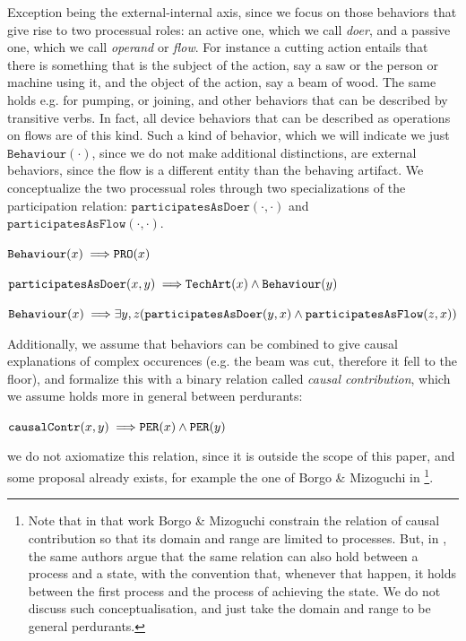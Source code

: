 \documentclass[sw]{iosart2x}
\newcommand{\bflist}{\begin{list}{}{\setlength{\topsep}{2mm}\setlength{\partopsep}{0mm}\setlength{\parsep}{0mm}\setlength{\leftmargin}{9mm}\setlength{\labelwidth}{8mm}}}
\newcommand{\eflist}{\end{list}}
\newcommand{\AxLabel}{\textrm{a}}
\newcounter{cntax}
\newcommand{\myax}[1]{\refstepcounter{cntax}\begin{small}{\bf \AxLabel\thecntax\label{ax:#1}}\end{small}}
\newcommand{\generalStyle}[1]{\texttt{#1}}
\newcommand{\biRel}[3]{\generalStyle{#1}(#2,#3)}
\newcommand{\uniRel}[2]{\generalStyle{#1}(#2)}
\newcommand{\myfi}{\hspace{0.9mm} \Longrightarrow}
\newcommand{\DOLCEProcess}[1]{\uniRel{PRO}{#1}}
\newcommand{\DOLCEPerdurant}[1]{\uniRel{{PER}}{#1}}
\newcommand{\TechArt}[1]{\uniRel{TechArt}{#1}}
\newcommand{\BehaviourConcrete}[1]{\uniRel{Behaviour}{#1}}
\newcommand{\causallyContr}[2]{\biRel{causalContr}{#1}{#2}}
\newcommand{\participateAsDoer}[2]{\biRel{participatesAsDoer}{#1}{#2}}
\newcommand{\participateAsFlow}[2]{\biRel{participatesAsFlow}{#1}{#2}}
\newcommand{\firstTimeKeyWord}[1]{\textit{#1}}
\begin{document}
Exception being the external-internal axis, since we focus on those behaviors that give rise to two processual roles: an active one, which we call \firstTimeKeyWord{doer}, and a passive one, which we call \firstTimeKeyWord{operand} or \firstTimeKeyWord{flow}. 
For instance a cutting action entails that there is something that is the subject of the action, say a saw or the person or machine using it, and the object of the action, say a beam of wood.
The same holds e.g. for pumping, or joining, and other behaviors that can be described by transitive verbs. 
In fact, all device behaviors that can be described as operations on flows are of this kind. 
Such a kind of behavior, which we will indicate we just $\BehaviourConcrete{\cdot}$, since we do not make additional distinctions, are external behaviors, since the flow is a different entity than the behaving artifact.
We conceptualize the two processual roles through two specializations of the participation relation: $\participateAsDoer{\cdot}{\cdot}$ and $\participateAsFlow{\cdot}{\cdot}$. 
\bflist
  \item[\myax{behaviorSubsum}] $ \BehaviourConcrete{x} \myfi \DOLCEProcess{x} $
  \item[\myax{participateAsDoerRage}]  $ \participateAsDoer{x}{y} \myfi \TechArt{x} \land \BehaviourConcrete{y} $
  \item[\myax{processualRoles}] $ \BehaviourConcrete{x} \myfi \exists y,z(\participateAsDoer{y}{x} \land \participateAsFlow{z}{x}) $ 
\eflist

Additionally, we assume that behaviors can be combined to give causal explanations of complex occurences (e.g. the beam was cut, therefore it fell to the floor), and formalize this with a binary relation called \firstTimeKeyWord{causal contribution}, which we assume holds more in general between perdurants:
\bflist
  \item[\myax{contribRange}] $ \causallyContr{x}{y} \myfi \DOLCEPerdurant{x} \land \DOLCEPerdurant{y} $
\eflist
we do not axiomatize this relation, since it is outside the scope of this paper, and some proposal already exists, for example the one of Borgo \& Mizoguchi in \cite{borgoFirstorderFormalizationEvent2014}\footnote{Note that in that work Borgo \& Mizoguchi constrain the relation of causal contribution so that its domain and range are limited to processes. But, in \cite{mizoguchiUnifyingDefinitionArtifact2016}, the same authors argue that the same relation can also hold between a process and a state, with the convention that, whenever that happen, it holds between the first process and the process of achieving the state.
We do not discuss such conceptualisation, and just take the domain and range to be general perdurants.}.
\end{document}
